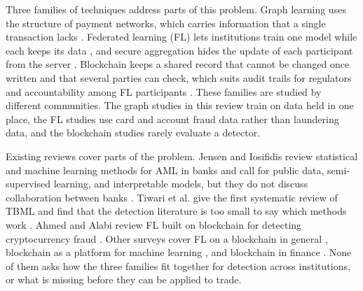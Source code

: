 \documentclass[journal]{IEEEtran}
\begin{document}
Three families of techniques address parts of this problem. Graph learning uses the structure of payment networks, which carries information that a single transaction lacks \cite{ferretti2025gnn,mao2026pmegnn,yu2023aetransgat}. Federated learning (FL) lets institutions train one model while each keeps its data \cite{mcmahan2017fedavg}, and secure aggregation hides the update of each participant from the server \cite{bonawitz2017secagg}. Blockchain keeps a shared record that cannot be changed once written and that several parties can check, which suits audit trails for regulators \cite{chen2024finance} and accountability among FL participants \cite{yang2022accountable}. These families are studied by different communities. The graph studies in this review train on data held in one place, the FL studies use card and account fraud data rather than laundering data, and the blockchain studies rarely evaluate a detector.

Existing reviews cover parts of the problem. Jensen and Iosifidis review statistical and machine learning methods for AML in banks and call for public data, semi-supervised learning, and interpretable models, but they do not discuss collaboration between banks \cite{jensen2023fighting}. Tiwari et al. give the first systematic review of TBML and find that the detection literature is too small to say which methods work \cite{tiwari2025tbml}. Ahmed and Alabi review FL built on blockchain for detecting cryptocurrency fraud \cite{ahmed2024bcfl}. Other surveys cover FL on a blockchain in general \cite{li2021befl}, blockchain as a platform for machine learning \cite{ural2023bcml}, and blockchain in finance \cite{chen2024finance}. None of them asks how the three families fit together for detection across institutions, or what is missing before they can be applied to trade.
\end{document}
